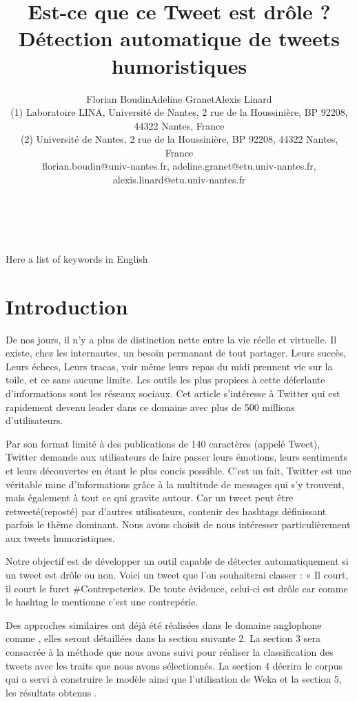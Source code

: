 \documentclass[10pt,a4paper,twoside]{article}
\title{Est-ce que ce Tweet est drôle ? Détection automatique de tweets humoristiques}
\author{Florian Boudin\up{1}\quad Adeline Granet\up{2}\quad Alexis Linard\up{2}\\
  (1) Laboratoire LINA, Université de Nantes, 2 rue de la Houssinière, BP 92208, 44322 Nantes, France \\ 
  (2) Université de Nantes, 2 rue de la Houssinière, BP 92208, 44322 Nantes, France\\ 
  florian.boudin@univ-nantes.fr, adeline.granet@etu.univ-nantes.fr, alexis.linard@etu.univ-nantes.fr \\ 
}
\begin{document}
\maketitle


\\

\\

{Here a list of keywords in English}


\section{Introduction}


De nos jours, il n’y a plus de distinction nette entre la vie réelle et virtuelle. Il existe, chez les internautes, un besoin permanant de tout partager. Leurs succès, Leurs échecs, Leurs tracas, voir même leurs repas du midi prennent vie sur la toile, et ce sans aucune limite. Les outils les plus propices à cette déferlante d’informations sont les réseaux sociaux. Cet article s'intéresse à Twitter qui est rapidement devenu leader dans ce domaine avec plus de 500 millions d’utilisateurs.

Par son format limité à des publications de 140 caractères (appelé Tweet), Twitter demande aux utilisateurs de faire passer leurs émotions, leurs sentiments et leurs découvertes en étant le plus concis possible. C’est un fait, Twitter est une véritable mine d’informations grâce à la multitude de messages qui s'y trouvent, mais également à tout ce qui gravite autour. Car un tweet peut être retweeté(reposté) par d'autres utilisateurs, contenir des hashtags définissant parfois le thème dominant.  Nous avons choisit de nous intéresser particulièrement aux tweets humoristiques.

Notre objectif est de développer un outil capable de détecter automatiquement si un tweet est drôle ou non. Voici un tweet que l’on souhaiterai classer : « Il court, il court le furet \#Contrepeterie».  De toute évidence, celui-ci est drôle car comme le hashtag le mentionne c’est une contrepérie. 

Des approches similaires ont déjà été réalisées dans le domaine anglophone comme \cite{Raz12, Barbosa2010}, elles seront détaillées dans la section suivante 2. La section 3 sera consacrée à la méthode que nous avons suivi pour réaliser la classification des tweets avec les traits que nous avons sélectionnés. La section 4 décrira le corpus qui a servi à construire le modèle ainsi que l’utilisation de Weka et la section 5, les résultats obtenus .
\end{document}
